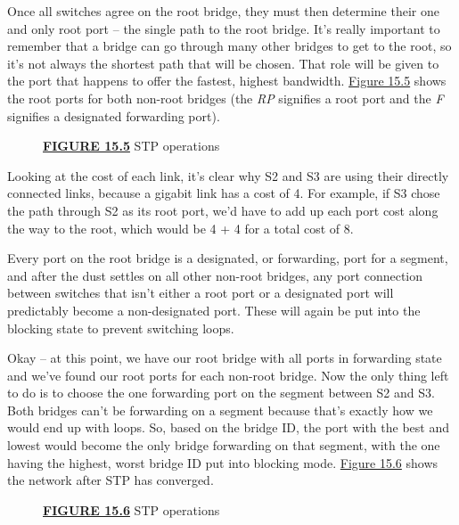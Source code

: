 Once all switches agree on the root bridge, they must then determine
their one and only root port -- the single path to the root bridge. It's
really important to remember that a bridge can go through many other
bridges to get to the root, so it's not always the shortest path that
will be chosen. That role will be given to the port that happens to
offer the fastest, highest bandwidth.
\protect\hyperlink{c15.xhtmlux5cux23figure15-5}{Figure 15.5} shows the
root ports for both non-root bridges (the \emph{RP} signifies a root
port and the \emph{F} signifies a designated forwarding port).



\begin{figure}
\centering
\caption{{\protect\hyperlink{c15.xhtmlux5cux23figureanchor15-5}{\textbf{FIGURE
15.5}} STP operations}}
\end{figure}

Looking at the cost of each link, it's clear why S2 and S3 are using
their directly connected links, because a gigabit link has a cost of 4.
For example, if S3 chose the path through S2 as its root port, we'd have
to add up each port cost along the way to the root, which would be 4 + 4
for a total cost of 8.

Every port on the root bridge is a designated, or forwarding, port for a
segment, and after the dust settles on all other non-root bridges, any
port connection between switches that isn't either a root port or a
designated port will predictably become a non-designated port. These
will again be put into the blocking state to prevent switching loops.

Okay -- at this point, we have our root bridge with all ports in
forwarding state and we've found our root ports for each non-root
bridge. Now the only thing left to do is to choose the one forwarding
port on the segment between S2 and S3. Both bridges can't be forwarding
on a segment because that's exactly how we would end up with loops. So,
based on the bridge ID, the port with the best and lowest would become
the only bridge forwarding on that segment, with the one having the
highest, worst bridge ID put into blocking mode.
\protect\hyperlink{c15.xhtmlux5cux23figure15-6}{Figure 15.6} shows the
network after STP has converged.

\begin{figure}
\centering
\caption{{\protect\hyperlink{c15.xhtmlux5cux23figureanchor15-6}{\textbf{FIGURE
15.6}} STP operations}}
\end{figure}

